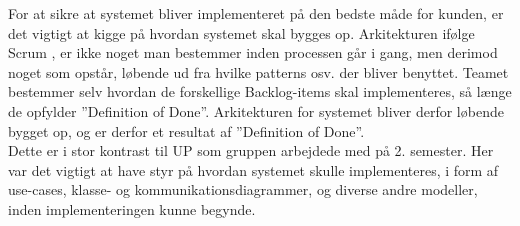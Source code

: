 For at sikre at systemet bliver implementeret på den bedste måde for kunden, 
er det vigtigt at kigge på hvordan systemet skal bygges op. 
Arkitekturen ifølge Scrum \cite{ScrumArchitecture}, er ikke noget man bestemmer inden processen går i gang,
men derimod noget som opstår, løbende ud fra hvilke patterns osv. der bliver benyttet. 
Teamet bestemmer selv hvordan de forskellige Backlog-items skal implementeres, 
så længe de opfylder ”Definition of Done”. Arkitekturen for systemet bliver derfor løbende bygget op, 
og er derfor et resultat af ”Definition of Done”. \\

Dette er i stor kontrast til UP som gruppen arbejdede med på 2. semester. 
Her var det vigtigt at have styr på hvordan systemet skulle implementeres, 
i form af use-cases, klasse- og kommunikationsdiagrammer, og diverse andre modeller, 
inden implementeringen kunne begynde. 